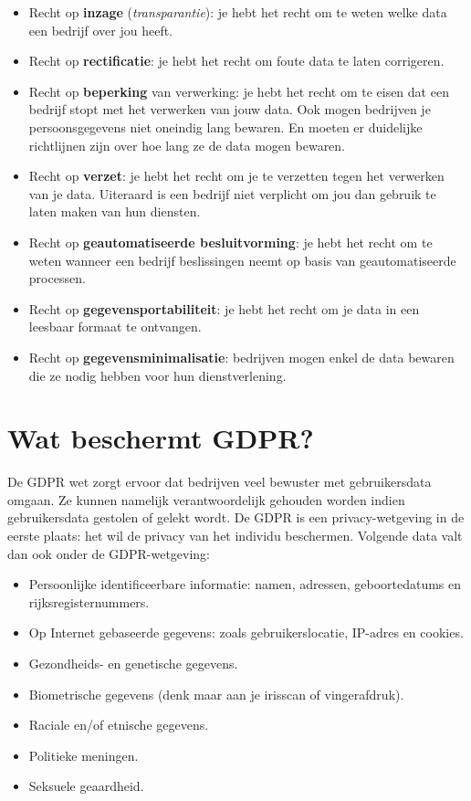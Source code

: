 \documentclass[
  10pt,
  dutch,
  paper=a4,
  ,captions=tableheading
]{scrbook}
\providecommand{\tightlist}{%
  \setlength{\itemsep}{0pt}\setlength{\parskip}{0pt}}
\begin{document}
\begin{itemize}
\tightlist
\item
  Recht op \textbf{inzage} (\emph{transparantie}): je hebt het recht om
  te weten welke data een bedrijf over jou heeft.
\item
  Recht op \textbf{rectificatie}: je hebt het recht om foute data te
  laten corrigeren.
\item
  Recht op \textbf{beperking} van verwerking: je hebt het recht om te
  eisen dat een bedrijf stopt met het verwerken van jouw data. Ook mogen
  bedrijven je persoonsgegevens niet oneindig lang bewaren. En moeten er
  duidelijke richtlijnen zijn over hoe lang ze de data mogen bewaren.
\item
  Recht op \textbf{verzet}: je hebt het recht om je te verzetten tegen
  het verwerken van je data. Uiteraard is een bedrijf niet verplicht om
  jou dan gebruik te laten maken van hun diensten.
\item
  Recht op \textbf{geautomatiseerde besluitvorming}: je hebt het recht
  om te weten wanneer een bedrijf beslissingen neemt op basis van
  geautomatiseerde processen.
\item
  Recht op \textbf{gegevensportabiliteit}: je hebt het recht om je data
  in een leesbaar formaat te ontvangen.
\item
  Recht op \textbf{gegevensminimalisatie}: bedrijven mogen enkel de data
  bewaren die ze nodig hebben voor hun dienstverlening.
\end{itemize}

\section{Wat beschermt GDPR?}\label{wat-beschermt-gdpr}

De GDPR wet zorgt ervoor dat bedrijven veel bewuster met gebruikersdata
omgaan. Ze kunnen namelijk verantwoordelijk gehouden worden indien
gebruikersdata gestolen of gelekt wordt. De GDPR is een
privacy-wetgeving in de eerste plaats: het wil de privacy van het
individu beschermen. Volgende data valt dan ook onder de GDPR-wetgeving:

\begin{itemize}
\tightlist
\item
  Persoonlijke identificeerbare informatie: namen, adressen,
  geboortedatums en rijksregisternummers.
\item
  Op Internet gebaseerde gegevens: zoals gebruikerslocatie, IP-adres en
  cookies.
\item
  Gezondheids- en genetische gegevens.
\item
  Biometrische gegevens (denk maar aan je irisscan of vingerafdruk).
\item
  Raciale en/of etnische gegevens.
\item
  Politieke meningen.
\item
  Seksuele geaardheid.
\end{itemize}
\end{document}
